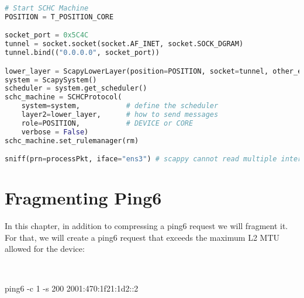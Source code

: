 \begin{lstlisting}[language=Python, caption={Program ping\_core2.py}, label=prog-ping-core2, basicstyle=\ttfamily\scriptsize]
# Start SCHC Machine
POSITION = T_POSITION_CORE

socket_port = 0x5C4C
tunnel = socket.socket(socket.AF_INET, socket.SOCK_DGRAM)
tunnel.bind(("0.0.0.0", socket_port))

lower_layer = ScapyLowerLayer(position=POSITION, socket=tunnel, other_end=None)
system = ScapySystem()
scheduler = system.get_scheduler()
schc_machine = SCHCProtocol(
    system=system,           # define the scheduler
    layer2=lower_layer,      # how to send messages
    role=POSITION,           # DEVICE or CORE
    verbose = False)         
schc_machine.set_rulemanager(rm)

sniff(prn=processPkt, iface="ens3") # scappy cannot read multiple interfaces
\end{lstlisting}

\chapter{Fragmenting Ping6}

In this chapter, in addition to compressing a ping6 request we will fragment it.
For that, we will create a ping6 request that exceeds the maximum L2 MTU allowed for the device:

~

\begin{termc}[backgroundcolor=\color{gray!10}, basicstyle=\ttfamily\small, escapechar=@]
ping6 -c 1 -s 200 2001:470:1f21:1d2::2
\end{termc}

